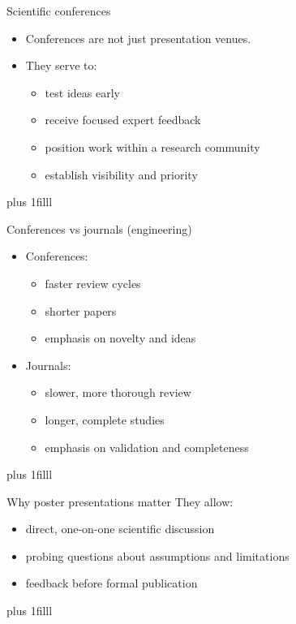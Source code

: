 \documentclass[aspectratio=169]{beamer}
\newcommand{\btVFill}{\vskip0pt plus 1filll}
\begin{document}
\begin{frame}{Scientific conferences}
  \begin{itemize}
    \item Conferences are not just presentation venues.
    \item They serve to:
      \begin{itemize}
        \item test ideas early
        \item receive focused expert feedback
        \item position work within a research community
        \item establish visibility and priority
      \end{itemize}
  \end{itemize}
  \btVFill
\
\end{frame}

\begin{frame}{Conferences vs journals (engineering)}
  \begin{itemize}
    \item Conferences:
      \begin{itemize}
        \item faster review cycles
        \item shorter papers
        \item emphasis on novelty and ideas
      \end{itemize}
    \item Journals:
      \begin{itemize}
        \item slower, more thorough review
        \item longer, complete studies
        \item emphasis on validation and completeness
      \end{itemize}
  \end{itemize}
\btVFill
\end{frame}

\begin{frame}{Why poster presentations matter}
  They allow:
  \begin{itemize}
    \item direct, one-on-one scientific discussion
    \item probing questions about assumptions and limitations
    \item feedback before formal publication
  \end{itemize}
  \btVFill
\end{frame}
\end{document}
